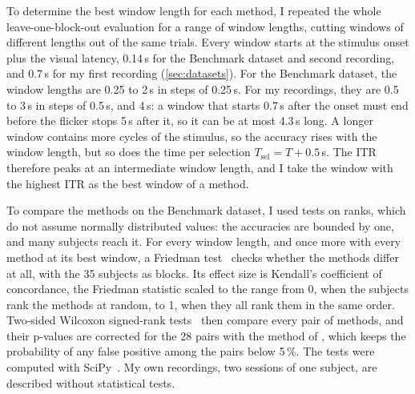To determine the best window length for each method, I repeated the whole leave-one-block-out
evaluation for a range of window lengths, cutting windows of different lengths out of the same
trials. Every window starts at the stimulus onset plus the visual latency, 0.14\,s for the
Benchmark dataset and second recording, and 0.7\,s for my first recording (\cref{sec:datasets}). For the Benchmark
dataset, the window lengths are 0.25 to 2\,s in steps of 0.25\,s. For my recordings, they are
0.5 to 3\,s in steps of 0.5\,s, and 4\,s: a window that starts 0.7\,s after the onset must end
before the flicker stops 5\,s after it, so it can be at most 4.3\,s long. A longer window
contains more cycles of the stimulus, so the accuracy rises with the window length, but so
does the time per selection $T_\mathrm{sel} = T + 0.5$\,s. The \ac{ITR} therefore peaks at an
intermediate window length, and I take the window with the highest \ac{ITR} as the best window
of a method.

To compare the methods on the Benchmark dataset, I used tests on ranks, which do not assume
normally distributed values: the accuracies are bounded by one, and many subjects reach it.
For every window length, and once more with every method at its best window, a Friedman
test~\citep{friedman1937ranks} checks whether the methods differ at all, with the 35 subjects
as blocks. Its effect size is Kendall's coefficient of concordance, the Friedman statistic
scaled to the range from 0, when the subjects rank the methods at random, to 1, when they all
rank them in the same order. Two-sided Wilcoxon signed-rank tests~\citep{wilcoxon1945} then
compare every pair of methods, and their p-values are corrected for the 28 pairs with the
method of \citet{holm1979}, which keeps the probability of any false positive among the pairs
below 5\,\%. The tests were computed with SciPy~\citep{virtanen2020scipy}. My own recordings,
two sessions of one subject, are described without statistical tests.
